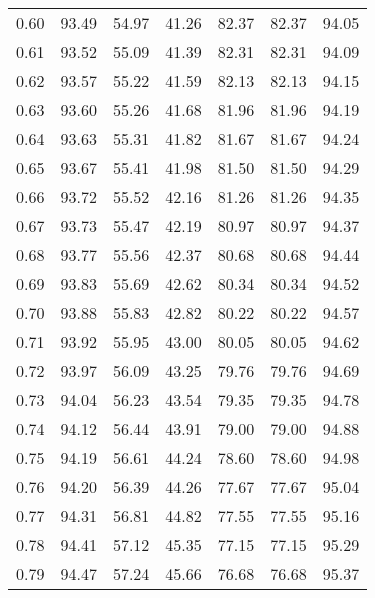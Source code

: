 \begin{tabular}{|c|c|c|c|c|c|c|}
      0.60 &     93.49 &     54.97 &      41.26 &   82.37 &      82.37 &         94.05 \\
      0.61 &     93.52 &     55.09 &      41.39 &   82.31 &      82.31 &         94.09 \\
      0.62 &     93.57 &     55.22 &      41.59 &   82.13 &      82.13 &         94.15 \\
      0.63 &     93.60 &     55.26 &      41.68 &   81.96 &      81.96 &         94.19 \\
      0.64 &     93.63 &     55.31 &      41.82 &   81.67 &      81.67 &         94.24 \\
      0.65 &     93.67 &     55.41 &      41.98 &   81.50 &      81.50 &         94.29 \\
      0.66 &     93.72 &     55.52 &      42.16 &   81.26 &      81.26 &         94.35 \\
      0.67 &     93.73 &     55.47 &      42.19 &   80.97 &      80.97 &         94.37 \\
      0.68 &     93.77 &     55.56 &      42.37 &   80.68 &      80.68 &         94.44 \\
      0.69 &     93.83 &     55.69 &      42.62 &   80.34 &      80.34 &         94.52 \\
      0.70 &     93.88 &     55.83 &      42.82 &   80.22 &      80.22 &         94.57 \\
      0.71 &     93.92 &     55.95 &      43.00 &   80.05 &      80.05 &         94.62 \\
      0.72 &     93.97 &     56.09 &      43.25 &   79.76 &      79.76 &         94.69 \\
      0.73 &     94.04 &     56.23 &      43.54 &   79.35 &      79.35 &         94.78 \\
      0.74 &     94.12 &     56.44 &      43.91 &   79.00 &      79.00 &         94.88 \\
      0.75 &     94.19 &     56.61 &      44.24 &   78.60 &      78.60 &         94.98 \\
      0.76 &     94.20 &     56.39 &      44.26 &   77.67 &      77.67 &         95.04 \\
      0.77 &     94.31 &     56.81 &      44.82 &   77.55 &      77.55 &         95.16 \\
      0.78 &     94.41 &     57.12 &      45.35 &   77.15 &      77.15 &         95.29 \\
      0.79 &     94.47 &     57.24 &      45.66 &   76.68 &      76.68 &         95.37 \\

\end{tabular}
